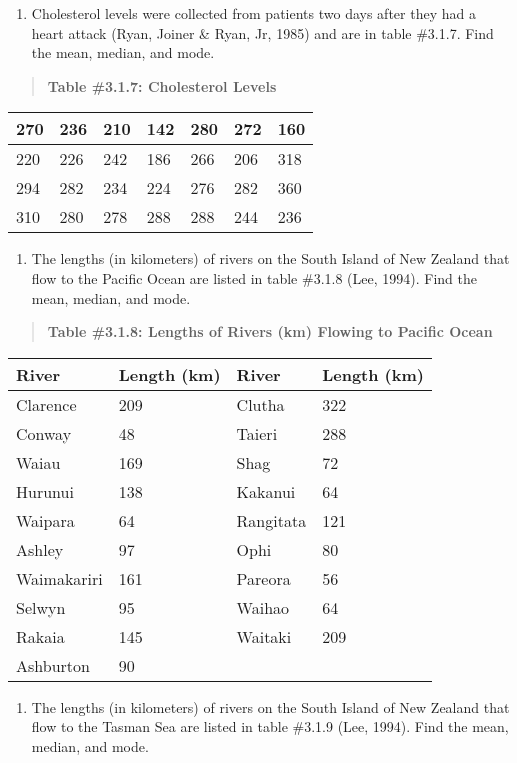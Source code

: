 \documentclass[]{book}
\providecommand{\tightlist}{%
  \setlength{\itemsep}{0pt}\setlength{\parskip}{0pt}}
\begin{document}
\begin{enumerate}
\def\labelenumi{\arabic{enumi}.}
\tightlist
\item
  Cholesterol levels were collected from patients two days after they had a heart attack (Ryan, Joiner \& Ryan, Jr, 1985) and are in table \#3.1.7. Find the mean, median, and mode.
\end{enumerate}

\begin{quote}
\textbf{Table \#3.1.7: Cholesterol Levels}
\end{quote}

\begin{longtable}[]{@{}lllllll@{}}
\toprule
270 & 236 & 210 & 142 & 280 & 272 & 160\tabularnewline
\midrule
\endhead
220 & 226 & 242 & 186 & 266 & 206 & 318\tabularnewline
294 & 282 & 234 & 224 & 276 & 282 & 360\tabularnewline
310 & 280 & 278 & 288 & 288 & 244 & 236\tabularnewline
\bottomrule
\end{longtable}

\begin{enumerate}
\def\labelenumi{\arabic{enumi}.}
\setcounter{enumi}{1}
\tightlist
\item
  The lengths (in kilometers) of rivers on the South Island of New
  Zealand that flow to the Pacific Ocean are listed in table \#3.1.8
  (Lee, 1994). Find the mean, median, and mode.
\end{enumerate}

\begin{quote}
\textbf{Table \#3.1.8: Lengths of Rivers (km) Flowing to Pacific Ocean}
\end{quote}

\begin{longtable}[]{@{}llll@{}}
\toprule
River & Length (km) & River & Length (km)\tabularnewline
\midrule
\endhead
Clarence & 209 & Clutha & 322\tabularnewline
Conway & 48 & Taieri & 288\tabularnewline
Waiau & 169 & Shag & 72\tabularnewline
Hurunui & 138 & Kakanui & 64\tabularnewline
Waipara & 64 & Rangitata & 121\tabularnewline
Ashley & 97 & Ophi & 80\tabularnewline
Waimakariri & 161 & Pareora & 56\tabularnewline
Selwyn & 95 & Waihao & 64\tabularnewline
Rakaia & 145 & Waitaki & 209\tabularnewline
Ashburton & 90 & &\tabularnewline
\bottomrule
\end{longtable}

\begin{enumerate}
\def\labelenumi{\arabic{enumi}.}
\setcounter{enumi}{2}
\tightlist
\item
  The lengths (in kilometers) of rivers on the South Island of New
  Zealand that flow to the Tasman Sea are listed in table \#3.1.9
  (Lee, 1994). Find the mean, median, and mode.
\end{enumerate}
\end{document}
